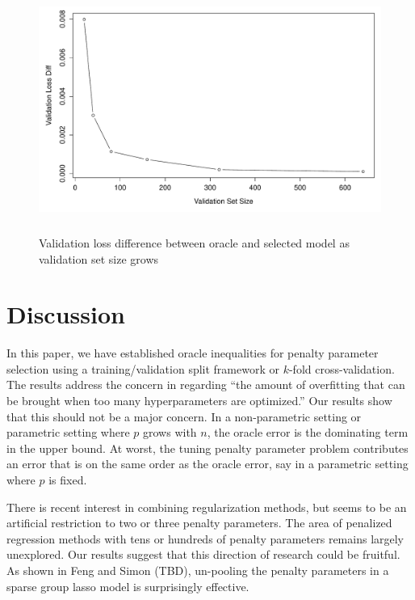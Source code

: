 \documentclass[12pt]{article}
\begin{document}
\begin{figure}
\label{fig:emp_v_theory}
\caption{
	Validation loss difference between oracle and selected model as validation set size grows
}
\centering
\includegraphics[height=80mm]{../R/figures/validation_size_loss_diff.pdf}
\end{figure}


\section{Discussion}\label{sec:discussion}

In this paper, we have established oracle inequalities for penalty parameter selection using a training/validation split framework or $k$-fold cross-validation. The results address the concern in \citet{bengio2000gradient} regarding ``the amount of overfitting that can be brought when too many hyperparameters are optimized.'' Our results show that 
this should not be a major concern. In a non-parametric setting or parametric setting where $p$ grows with $n$, the oracle error is the dominating term in the upper bound. At worst, the tuning penalty parameter problem contributes an error that is on the same order as the oracle error, say in a parametric setting where $p$ is fixed. 

There is recent interest in combining regularization methods, but seems to be an artificial restriction to two or three penalty parameters. The area of penalized regression methods with tens or hundreds of penalty parameters remains largely unexplored. Our results suggest that this direction of research could be fruitful. As shown in Feng and Simon (TBD), un-pooling the penalty parameters in a sparse group lasso model is surprisingly effective.
\end{document}

